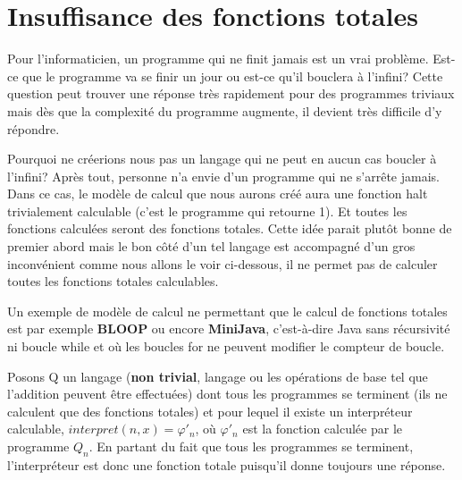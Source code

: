 

\section{Insuffisance des fonctions totales}
\label{sec:insuffisance_des_fonctions_totales}
Pour l'informaticien, un programme qui ne finit jamais est un vrai problème. Est-ce que le programme va se finir un jour ou est-ce qu'il bouclera à l'infini? Cette question peut trouver une réponse très rapidement pour des programmes triviaux mais dès que la complexité du programme augmente, il devient très difficile d'y répondre.

Pourquoi ne créerions nous pas un langage qui ne peut en aucun cas boucler à l'infini? Après tout, personne n'a envie d'un programme qui ne s'arrête jamais. Dans ce cas, le modèle de calcul que nous aurons créé aura une fonction halt trivialement calculable (c'est le programme qui retourne 1). Et toutes les fonctions calculées seront des fonctions totales. Cette idée parait plutôt bonne de premier abord mais le bon côté d'un tel langage est accompagné d'un gros inconvénient comme nous allons le voir ci-dessous, il ne permet pas de calculer toutes les fonctions totales calculables.

\begin{myexem}
Un exemple de modèle de calcul ne permettant que le calcul de fonctions totales est par exemple \textbf{BLOOP} ou encore \textbf{MiniJava}, c'est-à-dire Java sans récursivité ni boucle while et où les boucles for ne peuvent modifier le compteur de boucle.
\end{myexem}

Posons Q un langage (\textbf{non trivial}, langage ou les opérations de base tel que l'addition peuvent être effectuées) dont tous les programmes se terminent (ils ne calculent que des fonctions totales) et pour lequel il existe un interpréteur calculable, $interpret(n,x){} =\varphi'_n$, où
$\varphi'_n$ est la fonction calculée par le programme $Q_n$. En partant du fait que tous les programmes se terminent, l'interpréteur est donc une fonction totale puisqu'il donne toujours une réponse.

